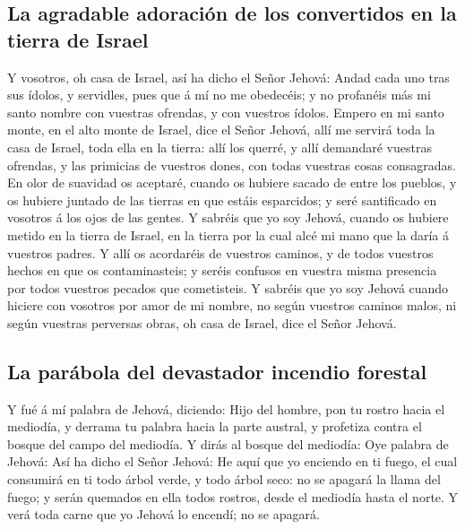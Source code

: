\hypertarget{la-agradable-adoraciuxf3n-de-los-convertidos-en-la-tierra-de-israel}{%
\subsection{La agradable adoración de los convertidos en la tierra de
Israel}\label{la-agradable-adoraciuxf3n-de-los-convertidos-en-la-tierra-de-israel}}

 Y vosotros, oh casa de Israel, así ha dicho el Señor
Jehová: Andad cada uno tras sus ídolos, y servidles, pues que á mí no me
obedecéis; y no profanéis más mi santo nombre con vuestras ofrendas, y
con vuestros ídolos.  Empero en mi santo monte, en el
alto monte de Israel, dice el Señor Jehová, allí me servirá toda la casa
de Israel, toda ella en la tierra: allí los querré, y allí demandaré
vuestras ofrendas, y las primicias de vuestros dones, con todas vuestras
cosas consagradas.  En olor de suavidad os aceptaré,
cuando os hubiere sacado de entre los pueblos, y os hubiere juntado de
las tierras en que estáis esparcidos; y seré santificado en vosotros á
los ojos de las gentes.  Y sabréis que yo soy Jehová,
cuando os hubiere metido en la tierra de Israel, en la tierra por la
cual alcé mi mano que la daría á vuestros padres.  Y allí
os acordaréis de vuestros caminos, y de todos vuestros hechos en que os
contaminasteis; y seréis confusos en vuestra misma presencia por todos
vuestros pecados que cometisteis.  Y sabréis que yo soy
Jehová cuando hiciere con vosotros por amor de mi nombre, no según
vuestros caminos malos, ni según vuestras perversas obras, oh casa de
Israel, dice el Señor Jehová.

\hypertarget{la-paruxe1bola-del-devastador-incendio-forestal}{%
\subsection{La parábola del devastador incendio
forestal}\label{la-paruxe1bola-del-devastador-incendio-forestal}}

 Y fué á mí palabra de Jehová, diciendo: 
Hijo del hombre, pon tu rostro hacia el mediodía, y derrama tu palabra
hacia la parte austral, y profetiza contra el bosque del campo del
mediodía.  Y dirás al bosque del mediodía: Oye palabra de
Jehová: Así ha dicho el Señor Jehová: He aquí que yo enciendo en ti
fuego, el cual consumirá en ti todo árbol verde, y todo árbol seco: no
se apagará la llama del fuego; y serán quemados en ella todos rostros,
desde el mediodía hasta el norte.  Y verá toda carne que
yo Jehová lo encendí; no se apagará.

